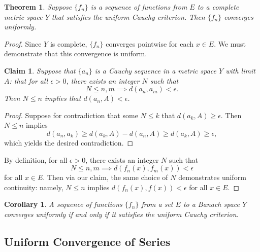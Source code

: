 \documentclass[11pt]{article}
\newtheorem{theorem}{Theorem}
\newtheorem{corollary}{Corollary}
\newtheorem{claim}{Claim}
\begin{document}
\begin{theorem}
	Suppose $\{ f_{n} \}$ is a sequence of functions from $E$ to a complete metric space $Y$ that satisfies the uniform Cauchy criterion. Then $\{ f_{n} \}$ converges uniformly.
\end{theorem}
\begin{adjustwidth}{1cm}{}
	\begin{proof}
		Since $Y$ is complete, $\{ f_{n} \}$ converges pointwise for each $x \in E$. We must demonstrate that this convergence is uniform.
		\begin{adjustwidth}{1cm}{}
			\begin{claim}
				Suppose that $\{ a_{n} \}$ is a Cauchy sequence in a metric space $Y$ with limit $A$: that for all $\epsilon > 0$, there exists an integer $N$ such that
				\[
					N \le n, m \implies d(a_{n}, a_{m}) < \epsilon.
				\]
				Then $N \le n$ implies that $d(a_{n}, A) < \epsilon$.
			\end{claim}
			\begin{proof}\renewcommand{\qedsymbol}{}
				Suppose for contradiction that some $N \le k$ that $d(a_{k}, A) \ge \epsilon$. Then $N \le n$ implies
				\[
					d(a_{n}, a_{k}) \ge d(a_{k}, A) - d(a_{n}, A) \ge d(a_{k}, A) \ge \epsilon,
				\]
				which yields the desired contradiction.
			\end{proof}
		\end{adjustwidth}
		By definition, for all $\epsilon > 0$, there exists an integer $N$ such that
		\[
			N \le n, m \implies d(f_{n}(x), f_{m}(x)) < \epsilon
		\]
		for all $x \in E$. Then via our claim, the same choice of $N$ demonstrates uniform continuity: namely, $N \le n$ implies $d(f_{n}(x), f(x)) < \epsilon$ for all $x \in E$.
	\end{proof}
\end{adjustwidth}
\begin{corollary}
	A sequence of functions $\{ f_{n} \}$ from a set $E$ to a Banach space $Y$ converges uniformly if and only if it satisfies the uniform Cauchy criterion.
\end{corollary}


\subsection{Uniform Convergence of Series}
\end{document}
